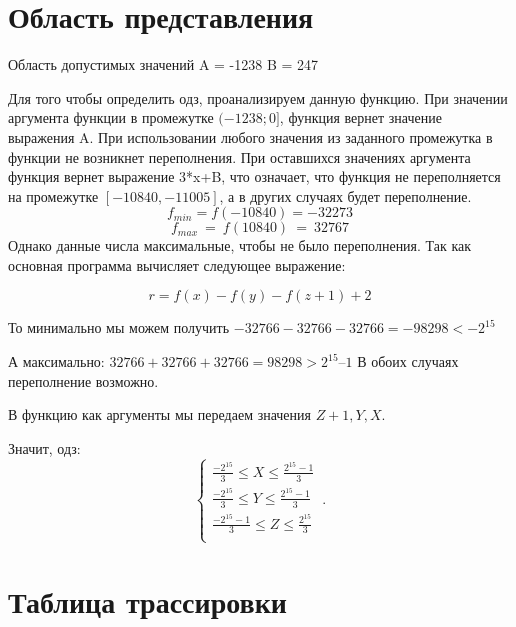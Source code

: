 \documentclass{article}
\begin{document}
\section{Область представления}

Область допустимых значений
A = -1238
B = 247

Для того чтобы определить одз, проанализируем данную функцию. При значении аргумента функции в промежутке $(-1238; 0]$, функция вернет значение выражения A. При использовании любого значения из заданного промежутка в функции не возникнет переполнения. При оставшихся значениях аргумента функция вернет выражение 3*x+B, что означает, что функция не переполняется на промежутке $[-10840, -11005]$, а в других случаях будет переполнение.
$$ f_{min}=f\left(-10840\right)=-32273 $$
$$ f_{max}\ =\ f(10840)\ =\ 32767 $$
Однако данные числа максимальные, чтобы не было переполнения.
Так как основная программа вычисляет следующее выражение:

$$ r = f(x) - f(y) - f(z + 1) + 2 $$

То минимально мы можем получить $-32766 -32766 - 32766 = -98298 < -2^{15}$

А максимально: $32766 + 32766 + 32766 = 98298 > 2^{15} – 1$
В обоих случаях переполнение возможно.

В функцию как аргументы мы передаем значения $Z+1, Y, X$.

Значит, одз:
$$ \begin{cases}
    \frac{-2^{15}}{3} \le X \le \frac{2^{15} - 1}{3} \\
    \frac{-2^{15}}{3} \le Y \le \frac{2^{15} - 1}{3} \\
    \frac{-2^{15} - 1}{3} \le Z \le \frac{2^{15}}{3} \\
  \end{cases}\,.
$$

\section{Таблица трассировки}
\end{document}
